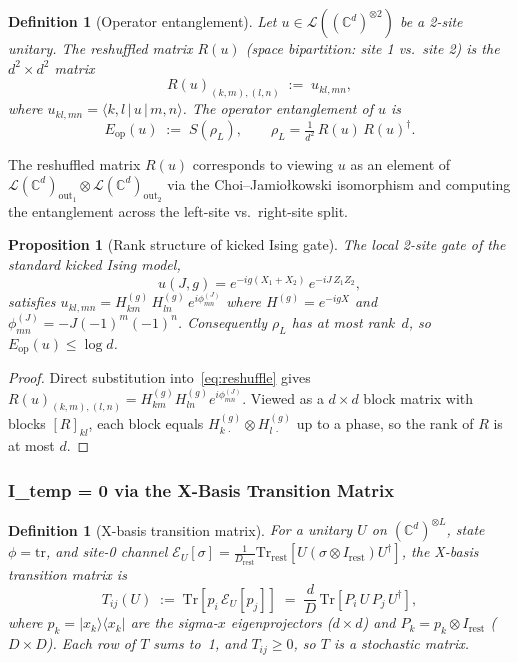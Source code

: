 \documentclass[12pt,a4paper]{article}
\newtheorem{proposition}[theorem]{Proposition}
\newtheorem{definition}[theorem]{Definition}
\newcommand{\CC}{\mathbb{C}}
\begin{document}
\begin{definition}[Operator entanglement]\label{def:op_ent}
Let $u\in\mathcal{L}((\CC^d)^{\otimes 2})$ be a 2-site unitary.
The \emph{reshuffled matrix} $R(u)$ (space bipartition: site 1 vs.\ site 2)
is the $d^2\times d^2$ matrix
\begin{equation}\label{eq:reshuffle}
  R(u)_{(k,m),(l,n)} \;:=\; u_{kl,mn},
\end{equation}
where $u_{kl,mn}=\langle k,l\,|\,u\,|\,m,n\rangle$.
The \emph{operator entanglement} of $u$ is
\begin{equation}\label{eq:Eop}
  E_\mathrm{op}(u) \;:=\; S(\rho_L),\qquad
  \rho_L = \tfrac{1}{d^2}\,R(u)\,R(u)^\dagger.
\end{equation}
\end{definition}

\noindent
The reshuffled matrix $R(u)$ corresponds to viewing $u$ as an element of
$\mathcal{L}(\CC^d)_{\mathrm{out}_1}\otimes\mathcal{L}(\CC^d)_{\mathrm{out}_2}$
via the Choi--Jamiołkowski isomorphism and computing the entanglement across the
left-site vs.\ right-site split.

\begin{proposition}[Rank structure of kicked Ising gate]\label{prop:rank}
The local 2-site gate of the standard kicked Ising model,
\begin{equation}
  u(J,g) = e^{-ig(X_1+X_2)}\,e^{-iJ\,Z_1Z_2},
\end{equation}
satisfies $u_{kl,mn} = H^{(g)}_{km}\,H^{(g)}_{ln}\,e^{i\phi_{mn}^{(J)}}$
where $H^{(g)}=e^{-igX}$ and $\phi_{mn}^{(J)}=-J(-1)^m(-1)^n$.
Consequently $\rho_L$ has at most rank~$d$, so
$E_\mathrm{op}(u)\le\log d$.
\end{proposition}
\begin{proof}
Direct substitution into~\eqref{eq:reshuffle} gives
$R(u)_{(k,m),(l,n)} = H^{(g)}_{km}H^{(g)}_{ln}e^{i\phi_{mn}^{(J)}}$.
Viewed as a $d\times d$ block matrix with blocks $[R]_{kl}$, each block equals
$H^{(g)}_{k\,\cdot}\otimes H^{(g)}_{l\,\cdot}$ up to a phase, so the rank of
$R$ is at most $d$.
\end{proof}

\subsubsection{I\_temp = 0 via the X-Basis Transition Matrix}

\begin{definition}[X-basis transition matrix]\label{def:transition}
For a unitary $U$ on $(\CC^d)^{\otimes L}$, state $\phi=\mathrm{tr}$,
and site-0 channel
$\mathcal{E}_U[\sigma]=\frac{1}{D_\mathrm{rest}}\mathrm{Tr}_\mathrm{rest}
[U(\sigma\otimes I_\mathrm{rest})U^\dagger]$,
the \emph{X-basis transition matrix} is
\begin{equation}\label{eq:Tmatrix}
  T_{ij}(U) \;:=\; \mathrm{Tr}[p_i\,\mathcal{E}_U[p_j]]
  \;=\; \frac{d}{D}\,\mathrm{Tr}[P_i\,U\,P_j\,U^\dagger],
\end{equation}
where $p_k=|x_k\rangle\langle x_k|$ are the sigma-$x$ eigenprojectors
($d\times d$) and $P_k=p_k\otimes I_\mathrm{rest}$ ($D\times D$).
Each row of $T$ sums to~1, and $T_{ij}\ge 0$, so $T$ is a stochastic matrix.
\end{definition}
\end{document}
